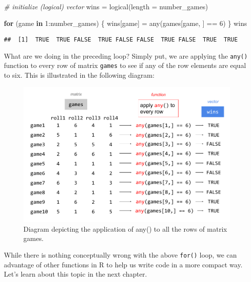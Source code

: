 \documentclass[
]{book}
\newenvironment{Shaded}{\begin{snugshade}}{\end{snugshade}}
\newcommand{\AttributeTok}[1]{\textcolor[rgb]{0.77,0.63,0.00}{#1}}
\newcommand{\CommentTok}[1]{\textcolor[rgb]{0.56,0.35,0.01}{\textit{#1}}}
\newcommand{\ControlFlowTok}[1]{\textcolor[rgb]{0.13,0.29,0.53}{\textbf{#1}}}
\newcommand{\DecValTok}[1]{\textcolor[rgb]{0.00,0.00,0.81}{#1}}
\newcommand{\FunctionTok}[1]{\textcolor[rgb]{0.00,0.00,0.00}{#1}}
\newcommand{\NormalTok}[1]{#1}
\newcommand{\OtherTok}[1]{\textcolor[rgb]{0.56,0.35,0.01}{#1}}
\newcommand{\SpecialCharTok}[1]{\textcolor[rgb]{0.00,0.00,0.00}{#1}}
\begin{document}
\begin{Shaded}
\begin{Highlighting}[]
\CommentTok{\# initialize (logical) vector}
\NormalTok{wins }\OtherTok{=} \FunctionTok{logical}\NormalTok{(}\AttributeTok{length =}\NormalTok{ number\_games)}

\ControlFlowTok{for}\NormalTok{ (game }\ControlFlowTok{in} \DecValTok{1}\SpecialCharTok{:}\NormalTok{number\_games) \{}
\NormalTok{  wins[game] }\OtherTok{=} \FunctionTok{any}\NormalTok{(games[game, ] }\SpecialCharTok{==} \DecValTok{6}\NormalTok{)}
\NormalTok{\}}
\NormalTok{wins}
\end{Highlighting}
\end{Shaded}

\begin{verbatim}
##  [1]  TRUE  TRUE FALSE  TRUE FALSE FALSE  TRUE FALSE  TRUE  TRUE
\end{verbatim}

What are we doing in the preceding loop? Simply put, we are applying the
\texttt{any()} function to every row of matrix \texttt{games} to see if any of the row
elements are equal to six. This is illustrated in the following diagram:

\begin{figure}

{\centering \includegraphics[width=0.9\linewidth]{images/demere-10-games-any} 

}

\caption{Diagram depicting the application of any() to all the rows of matrix games.}\label{fig:unnamed-chunk-27}
\end{figure}

While there is nothing conceptually wrong with the above \texttt{for()} loop, we can
advantage of other functions in R to help us write code in a more compact way.
Let's learn about this topic in the next chapter.
\end{document}
